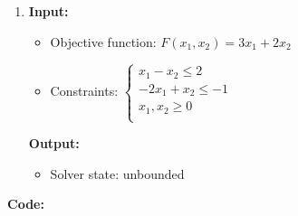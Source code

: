 \documentclass{article}
\begin{document}
\begin{enumerate}[label={(\arabic*)}]
          \vspace{0.25in}

    \item \textbf{Input:}
          \begin{itemize}
              \item Objective function: \(F(x_1, x_2) = 3 x_1 + 2 x_2\)
              \item Constraints: \(\begin{cases}
                        x_1 - x_2 \le 2     \\
                        -2 x_1 + x_2 \le -1 \\
                        x_1, x_2 \ge 0      \\
                    \end{cases}\)
          \end{itemize}

          \textbf{Output:}
          \begin{itemize}
              \item Solver state: unbounded
          \end{itemize}
\end{enumerate}

\newpage

\textbf{Code:}


\newpage


\newpage

\end{document}
